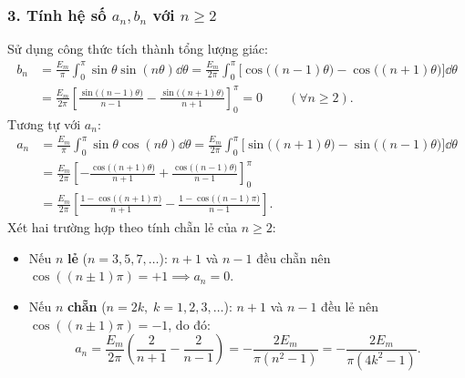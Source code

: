\subsubsection*{3. Tính hệ số $a_n, b_n$ với $n \ge 2$}
Sử dụng công thức tích thành tổng lượng giác:
\begin{align}
    b_n &= \frac{E_m}{\pi}\int_{0}^{\pi} \sin\theta \sin(n\theta)\dd\theta
         = \frac{E_m}{2\pi}\int_{0}^{\pi} \Big[\cos\big((n-1)\theta\big) - \cos\big((n+1)\theta\big)\Big]\dd\theta \nonumber\\
        &= \frac{E_m}{2\pi}\left[\frac{\sin\big((n-1)\theta\big)}{n-1} - \frac{\sin\big((n+1)\theta\big)}{n+1}\right]_{0}^{\pi} = 0 \qquad (\forall n \ge 2).
\end{align}
Tương tự với $a_n$:
\begin{align}
    a_n &= \frac{E_m}{\pi}\int_{0}^{\pi} \sin\theta \cos(n\theta)\dd\theta
         = \frac{E_m}{2\pi}\int_{0}^{\pi} \Big[\sin\big((n+1)\theta\big) - \sin\big((n-1)\theta\big)\Big]\dd\theta \nonumber\\
        &= \frac{E_m}{2\pi}\left[-\frac{\cos\big((n+1)\theta\big)}{n+1} + \frac{\cos\big((n-1)\theta\big)}{n-1}\right]_{0}^{\pi} \nonumber\\
        &= \frac{E_m}{2\pi}\left[\frac{1 - \cos\big((n+1)\pi\big)}{n+1} - \frac{1 - \cos\big((n-1)\pi\big)}{n-1}\right].
\end{align}
Xét hai trường hợp theo tính chẵn lẻ của $n \ge 2$:
\begin{itemize}
    \item Nếu $n$ \textbf{lẻ} ($n = 3, 5, 7, \dots$): $n+1$ và $n-1$ đều chẵn nên $\cos((n\pm 1)\pi) = +1 \implies a_n = 0$.
    \item Nếu $n$ \textbf{chẵn} ($n = 2k,\; k = 1, 2, 3, \dots$): $n+1$ và $n-1$ đều lẻ nên $\cos((n\pm 1)\pi) = -1$, do đó:
    \begin{equation}
        a_n = \frac{E_m}{2\pi}\left(\frac{2}{n+1} - \frac{2}{n-1}\right)
            = -\frac{2E_m}{\pi(n^2 - 1)}
            = -\frac{2E_m}{\pi(4k^2 - 1)}.
    \end{equation}
\end{itemize}

